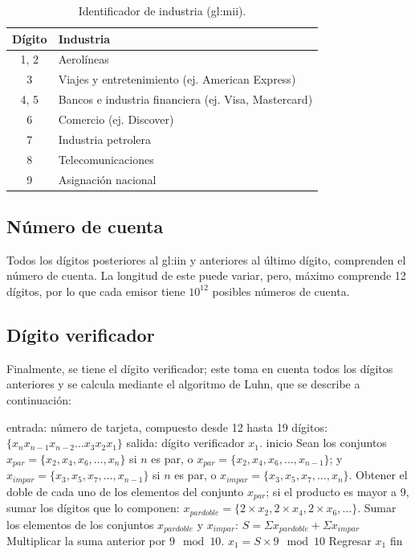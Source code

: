 \begin{table}[H]
  \centering
  \begin{tabular}{ c|l }
    Dígito & Industria \\ \hline
    1, 2 & Aerolíneas \\
    3 & Viajes y entretenimiento (ej. American Express) \\
    4, 5 &  Bancos e industria financiera (ej. Visa, Mastercard)\\
    6 & Comercio (ej. Discover) \\
    7 &  Industria petrolera \\
    8 &  Telecomunicaciones \\
    9 &  Asignación nacional \\
    \end{tabular}
    \caption{Identificador de industria (\gls{gl:mii}).}\label{tabla:mii}
\end{table}

\subsection{Número de cuenta}
Todos los dígitos posteriores al \gls{gl:iin} y anteriores al último dígito,
comprenden el número de cuenta. La longitud de este puede variar, pero, máximo
comprende 12 dígitos, por lo que cada emisor tiene $10^{12}$ posibles números
de cuenta.

\subsection{Dígito verificador}
Finalmente, se tiene el dígito verificador; este toma en cuenta todos los
dígitos anteriores y se calcula mediante el algoritmo de Luhn, que se describe
a continuación:

\begin{pseudocodigo}[%
    caption={Algoritmo de Luhn.},
    label={luhn:1}%
  ]
  entrada: número de tarjeta, compuesto desde 12 hasta 19 dígitos:
           $\{x_{n} x_{n-1} x_{n-2} \dots x_3 x_2 x_1\}$
  salida:  dígito verificador $x_1$.
  inicio
    Sean los conjuntos $x_{par} = \{x_2, x_4, x_6, \dots, x_n\}$ si $n$ es par, o $x_{par} = \{x_2, x_4, x_6, \dots, x_{n-1}\}$; y
                       $x_{impar} = \{x_3, x_5, x_7, \dots, x_{n-1}\}$ si $n$ es par, o $x_{impar} = \{x_3, x_5, x_7, \dots, x_n\}$.
    Obtener el doble de cada uno de los elementos del conjunto $x_{par}$; si
      el producto es mayor a 9, sumar los dígitos que lo componen:
      $x_{par doble} = \{2 \times x_2, 2 \times x_4, 2 \times x_6, \dots \}$.
    Sumar los elementos de los conjuntos $x_{par doble}$ y $x_{impar}$:
      $S = \Sigma x_{par doble} + \Sigma x_{impar}$
    Multiplicar la suma anterior por $9 \mod  10$.
      $x_1 = S \times 9 \mod 10$
    Regresar $x_1$
  fin
\end{pseudocodigo}
